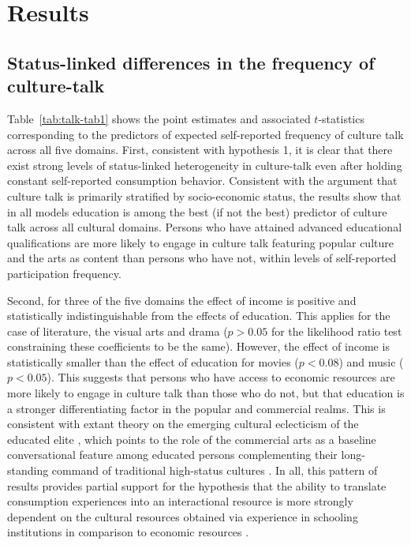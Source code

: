 \section{Results}
\subsection{Status-linked differences in the frequency of culture-talk}
Table~\ref{tab:talk-tab1} shows the point estimates and associated $t$-statistics corresponding to the predictors of expected self-reported frequency of culture talk across all five domains. First, consistent with hypothesis 1, it is clear that there exist strong levels of status-linked heterogeneity in culture-talk even after holding constant self-reported consumption behavior.  Consistent with the argument that culture talk is primarily stratified by socio-economic status, the results show that in all models education is among the best (if not the best) predictor of culture talk across all cultural domains. Persons who have attained advanced educational qualifications are more likely to engage in culture talk featuring popular culture and the arts as content than persons who have not, within levels of self-reported participation frequency. 


Second, for three of the five domains the effect of income is positive and statistically indistinguishable from the effects of education. This applies for the case of literature, the visual arts and drama ($p > 0.05$ for the likelihood ratio test constraining these coefficients to be the same). However, the effect of income is statistically smaller than the effect of education for movies ($p < 0.08$) and music ($p < 0.05$).  This suggests that persons who have access to economic resources are more likely to engage in culture talk than those who do not, but that education is a stronger differentiating factor in the popular and commercial realms. This is consistent with extant theory on the emerging cultural eclecticism of the educated elite \citep{peterson05, dimaggio96, ollivier04}, which points to the role of the commercial arts as a baseline conversational feature among educated persons complementing their long-standing command of traditional high-status cultures \citep{lizardo06a, dimaggio87}. In all, this pattern of results provides partial support for the hypothesis that the ability to translate consumption experiences into an interactional resource is more strongly dependent on the cultural resources obtained via experience in schooling institutions in comparison to economic resources \citep{bourdieu84, dimaggio96, lizardo06a}.

